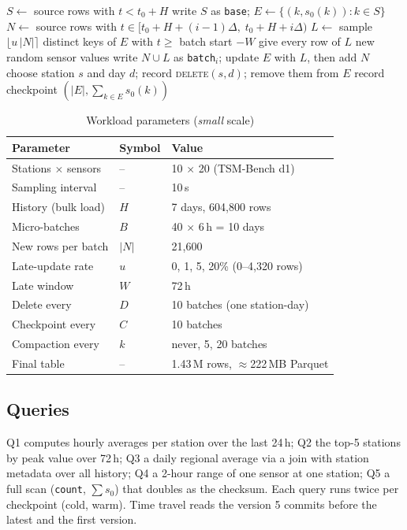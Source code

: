 \documentclass[conference]{IEEEtran}
\newcommand{\sys}{\textsc{sensor-LST}}
\begin{document}
\begin{algorithm}[t]
\caption{\sys{} stream generation for late-update rate $u$}\label{alg:gen}
\begin{algorithmic}[1]
\State $S \gets$ source rows with $t < t_0 + H$ 
\State write $S$ as \texttt{base}; $E \gets \{(k, s_0(k)) : k \in S\}$ 
  \State $N \gets$ source rows with $t \in [t_0{+}H{+}(i{-}1)\Delta,\; t_0{+}H{+}i\Delta)$
  \State $L \gets$ sample $\lfloor u\,|N|\rceil$ distinct keys of $E$ with $t \ge$ batch start $- W$
  \State give every row of $L$ new random sensor values
  \State write $N \cup L$ as \texttt{batch}$_i$; update $E$ with $L$, then add $N$
   \State choose station $s$ and day $d$; record \textsc{delete}$(s,d)$; remove them from $E$ \EndIf
   \State record checkpoint $(|E|, \sum_{k\in E} s_0(k))$ \EndIf
\EndFor
\end{algorithmic}
\end{algorithm}

\begin{table}[t]\centering
\caption{Workload parameters (\emph{small} scale)}\label{tab:params}
\footnotesize
\begin{tabular}{@{}lll@{}}\toprule
Parameter & Symbol & Value\\\midrule
Stations $\times$ sensors & -- & 10 $\times$ 20 (TSM-Bench d1)\\
Sampling interval & -- & 10\,s\\
History (bulk load) & $H$ & 7 days, 604{,}800 rows\\
Micro-batches & $B$ & 40 $\times$ 6\,h = 10 days\\
New rows per batch & $|N|$ & 21{,}600\\
Late-update rate & $u$ & 0, 1, 5, 20\% (0--4{,}320 rows)\\
Late window & $W$ & 72\,h\\
Delete every & $D$ & 10 batches (one station-day)\\
Checkpoint every & $C$ & 10 batches\\
Compaction every & $k$ & never, 5, 20 batches\\
Final table & -- & 1.43\,M rows, $\approx$222\,MB Parquet\\\bottomrule
\end{tabular}
\end{table}

\subsection{Queries}
Q1 computes hourly averages per station over the last 24\,h; Q2 the top-5 stations by peak value over 72\,h;
Q3 a daily regional average via a join with station metadata over all history; Q4 a 2-hour range of one sensor at one
station; Q5 a full scan (\texttt{count}, $\sum s_0$) that doubles as the checksum. Each query runs twice per checkpoint
(cold, warm). Time travel reads the version 5 commits before the latest and the first version.
\end{document}

